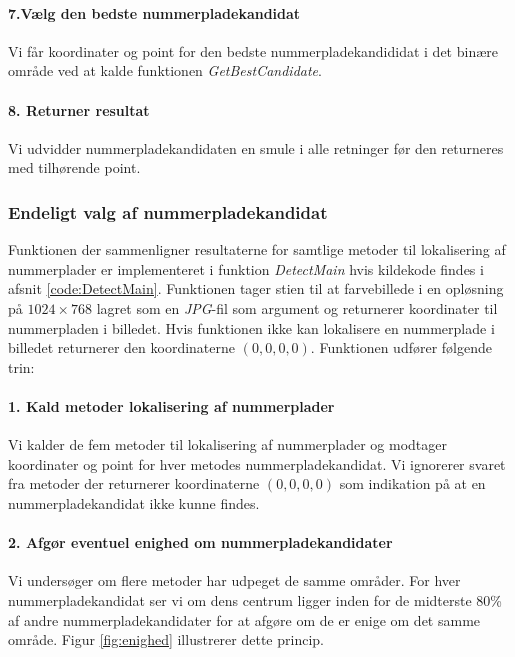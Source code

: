 \paragraph{7.Vælg den bedste nummerpladekandidat}
Vi får koordinater og point for den bedste nummerpladekandididat i det binære område ved at kalde funktionen \textit{GetBestCandidate}. 

\paragraph{8. Returner resultat}
Vi udvidder nummerpladekandidaten en smule i alle retninger før den returneres med tilhørende point.

\subsubsection{Endeligt valg af nummerpladekandidat}
Funktionen der sammenligner resultaterne for samtlige metoder til lokalisering af nummerplader er implementeret i funktion \textit{DetectMain} hvis kildekode findes i afsnit \vref{code:DetectMain}. Funktionen tager stien til at farvebillede i en opløsning på $1024 \times 768$ lagret som en \textit{JPG}-fil som argument og returnerer koordinater til nummerpladen i billedet. Hvis funktionen ikke kan lokalisere en nummerplade i billedet returnerer den koordinaterne $(0,0,0,0)$. Funktionen udfører følgende trin: 

\paragraph{1. Kald metoder lokalisering af nummerplader}
Vi kalder de fem metoder til lokalisering af nummerplader og modtager koordinater og point for hver metodes nummerpladekandidat. Vi ignorerer svaret fra metoder der returnerer koordinaterne $(0,0,0,0)$ som indikation på at en nummerpladekandidat ikke kunne findes.

\paragraph{2. Afgør eventuel enighed om nummerpladekandidater}
Vi undersøger om flere metoder har udpeget de samme områder. For hver nummerpladekandidat ser vi om dens centrum ligger inden for de midterste 80\% af andre nummerpladekandidater for at afgøre om de er enige om det samme område. Figur \vref{fig:enighed} illustrerer dette princip.

